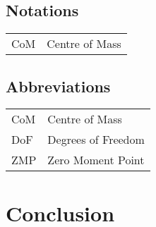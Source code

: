 \documentclass{thesisreport}
\begin{document}




 
 
\section*{Notations}
    \begin{tabular}{p{3cm}p{10cm}}
    CoM & Centre of Mass
    \end{tabular}

\newpage

\section*{Abbreviations}

\begin{tabular}{p{3cm}p{10cm}}
CoM & Centre of Mass \\
DoF & Degrees of Freedom \\
ZMP & Zero Moment Point \\

\end{tabular}

 \newpage
 
 \tableofcontents

 \listoffigures
 
\listoftables
 

 
 
 
  
  
 
 
 \chapter*{Conclusion}
 
 
 
 
 
 \appendix	
 
 
 
 
 
 
 
 
\end{document}
